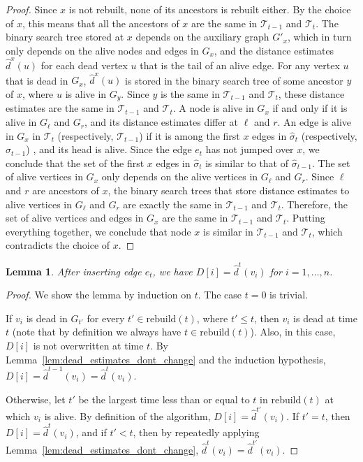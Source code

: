 \documentclass[11pt]{article}
\newtheorem{lemma}{Lemma}
\newcommand{\calT}{\mathcal{T}}
\newcommand{\rebuild}{\text{rebuild}}
\begin{document}
\begin{proof}
    Since $x$ is not rebuilt, none of its ancestors is rebuilt either. By the choice of $x$, this means that all the ancestors of $x$ are the same in $\mathcal{T}_{t-1}$ and $\mathcal{T}_t$.
    The binary search tree stored at $x$ depends on the auxiliary graph $G'_x$, which in turn only depends on the alive nodes and edges in $G_x$, and the distance estimates $\hat{d}^x(u)$ for each dead vertex $u$ that is the tail of an alive edge. 
    For any vertex $u$ that is dead in $G_x$, $\hat{d}^x(u)$ is stored in the binary search tree of some ancestor $y$ of $x$, where $u$ is alive in $G_y$. 
    Since $y$ is the same in $\calT_{t-1}$ and $\calT_t$, these distance estimates are the same in $\calT_{t-1}$ and $\calT_t$.
    A node is alive in $G_x$ if and only if it is alive in $G_\ell$ and $G_r$, and its distance estimates differ at $\ell$ and $r$. 
    An edge is alive in $G_x$ in $\calT_t$ (respectively, $\calT_{t-1}$) if it is among the first $x$ edges in $\hat{\sigma}_t$ (respectively, $\hat{\sigma}_{t-1}$) , and its head is alive. 
    Since the edge $e_t$ has not jumped over $x$, we conclude that the set of the first $x$ edges in $\hat{\sigma}_t$ is similar to that of $\hat{\sigma}_{t-1}$.
    The set of alive vertices in $G_x$ only depends on the alive vertices in $G_\ell$ and $G_r$. Since $\ell$ and $r$ are ancestors of $x$, the binary search trees that store distance estimates to alive vertices in $G_\ell$ and $G_r$ are exactly the same in $\calT_{t-1}$ and $\calT_t$.
    Therefore, the set of alive vertices and edges in $G_x$ are the same in $\calT_{t-1}$ and $\calT_t$. 
    Putting everything together, we conclude that node $x$ is similar in $\calT_{t-1}$ and $\calT_t$, which contradicts the choice of $x$.  
\end{proof}

\begin{lemma}
\label{lem:D}
    After inserting edge $e_t$, we have $D[i] = \hat{d}^t(v_i)$ for $i=1,\ldots,n$.
\end{lemma}

\begin{proof}
    We show the lemma by induction on $t$. The case $t = 0$ is trivial. 
        
    If $v_i$ is dead in $G_{t'}$ for every $t'\in \rebuild(t)$, where $t' \leq t$, then $v_i$ is dead at time $t$ (note that by definition we always have $t \in \rebuild(t)$).
    Also, in this case, $D[i]$ is not overwritten at time $t$. By Lemma~\ref{lem:dead_estimates_dont_change} and the induction hypothesis, $D[i] = \hat{d}^{t-1}(v_i) = \hat{d}^t(v_i)$. 

    Otherwise, let $t'$ be the largest time less than or equal to $t$ in $\rebuild(t)$ at which $v_i$ is alive.  By definition of the algorithm, $D[i] = \hat{d}^{t'}(v_i)$.
    If $t' = t$, then $D[i] = \hat{d}^{t}(v_i)$, and if $t' < t$, then by repeatedly applying Lemma~\ref{lem:dead_estimates_dont_change}, $\hat{d}^t(v_i) = \hat{d}^{t'}(v_i)$.
\end{proof}
\end{document}

